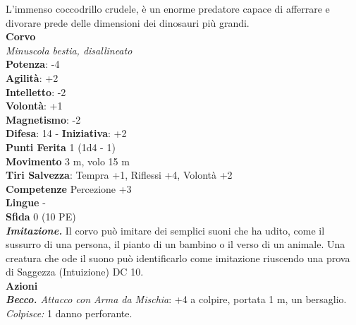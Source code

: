 \begin{multicols}{2}
L’immenso coccodrillo crudele, è un enorme predatore capace di afferrare e divorare prede delle dimensioni dei dinosauri più grandi. \\


\medskip\textbf{Corvo}\\
\emph{Minuscola bestia, disallineato}\\
\textbf{Potenza}: -4\\
\textbf{Agilità}: +2\\
\textbf{Intelletto}: -2\\
\textbf{Volontà}: +1\\
\textbf{Magnetismo}: -2\\
\textbf{Difesa}: 14 - \textbf{Iniziativa}: +2\\
\textbf{Punti Ferita} 1 (1d4 - 1)\\
\textbf{Movimento} 3 m, volo 15 m\\
\textbf{Tiri Salvezza}: Tempra +1, Riﬂessi +4, Volontà +2 \\
\textbf{Competenze} Percezione +3\\
\textbf{Lingue} -\\
\textbf{Sfida} 0 (10 PE)\smallskip\\
\emph{\textbf{Imitazione.}} Il corvo può imitare dei semplici suoni che ha udito, come il sussurro di una persona, il pianto di un bambino o il verso di un animale. Una creatura che ode il suono può identificarlo come imitazione riuscendo una prova di Saggezza (Intuizione) DC 10.\\
\smallskip\textbf{Azioni}\\
\emph{\textbf{Becco.} Attacco con Arma da Mischia}: +4 a colpire, portata 1 m, un bersaglio.\\
\emph{Colpisce:} 1 danno perforante.\\



\end{multicols}
